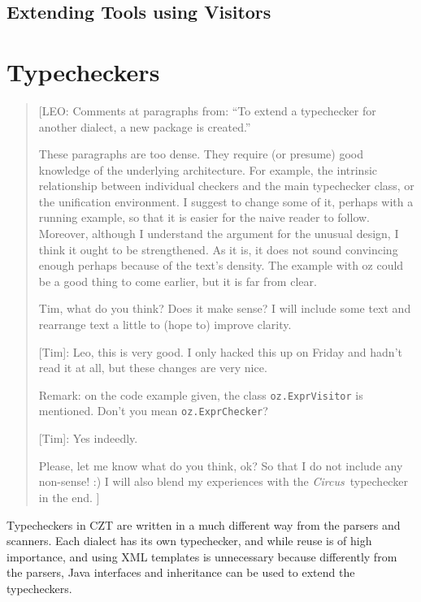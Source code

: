 \documentclass{llncs}
\newcommand{\Circus}{{\sf\slshape Circus}}
\begin{document}
\subsection{Extending Tools using Visitors}
\label{extending-visitors}


\section{Typecheckers}
\label{typecheckers}

\begin{quotation}
[LEO: Comments at paragraphs from: ``To extend a typechecker for another dialect,
      a new package is created.''

      \vspace{5pt}

      These paragraphs are too dense. They require (or presume) good knowledge of
      the underlying architecture. For example, the intrinsic relationship between
      individual checkers and the main typechecker class, or the unification environment.
      I suggest to change some of it, perhaps with a running example, so that it is easier
      for the naive reader to follow.
      Moreover, although I understand the argument for the unusual design,
      I think it ought to be strengthened. As it is, it does not sound convincing
      enough perhaps because of the text's density. The example with oz could be
      a good thing to come earlier, but it is far from clear.

      \vspace{5pt}

      Tim, what do you think? Does it make sense?
      I will include some text and rearrange text a little to (hope
      to) improve clarity.

      [Tim]: Leo, this is very good. I only hacked this up on Friday
      and hadn't read it at all, but these changes are very nice.

      Remark: on the code example given, the class {\tt oz.ExprVisitor} is mentioned.
      Don't you mean {\tt oz.ExprChecker}?

     [Tim]: Yes indeedly.

      Please, let me know what do you think, ok? So that I do not include any non-sense! :)
      I will also blend my experiences with the \Circus\ typechecker in the end.
      ]
\end{quotation}

Typecheckers in CZT are written in a much different way from the parsers
and scanners. Each dialect has its own typechecker, and while reuse
is of high importance, and using XML templates is unnecessary because
differently from the parsers, Java interfaces and inheritance can be used to
extend the typecheckers.
\end{document}
